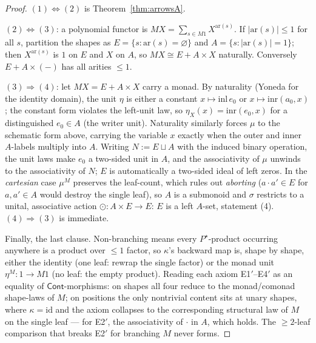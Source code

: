 \documentclass[11pt]{amsart}
\theoremstyle{plain}
\theoremstyle{definition}
\theoremstyle{remark}
\newcommand{\Cont}{\mathsf{Cont}}
\newcommand{\id}{\mathrm{id}}
\begin{document}
\begin{proof}
$(1)\Leftrightarrow(2)$ is Theorem~\ref{thm:arrowsA}.

$(2)\Leftrightarrow(3)$: a polynomial functor is $MX=\sum_{s\in M1}X^{\mathrm{ar}(s)}$. If
$|\mathrm{ar}(s)|\le1$ for all $s$, partition the shapes as $E=\{s:\mathrm{ar}(s)=
\varnothing\}$ and $A=\{s:|\mathrm{ar}(s)|=1\}$; then $X^{\mathrm{ar}(s)}$ is $1$ on $E$ and
$X$ on $A$, so $MX\cong E + A\times X$ naturally. Conversely $E+A\times(-)$ has all arities
$\le1$.

$(3)\Rightarrow(4)$: let $MX=E+A\times X$ carry a monad. By naturality (Yoneda for the
identity domain), the unit $\eta$ is either a constant $x\mapsto\mathrm{inl}\,e_0$ or
$x\mapsto\mathrm{inr}(a_0,x)$; the constant form violates the left-unit law, so
$\eta_X(x)=\mathrm{inr}(e_0,x)$ for a distinguished $e_0\in A$ (the writer unit). Naturality
similarly forces $\mu$ to the schematic form above, carrying the variable $x$ exactly when the
outer and inner $A$-labels multiply into $A$. Writing $N:=E\sqcup A$ with the induced binary
operation, the unit laws make $e_0$ a two-sided unit in $A$, and the associativity of $\mu$
unwinds to the associativity of $N$; $E$ is automatically a two-sided ideal of left zeros. In
the \emph{cartesian} case $\mu^M$ preserves the leaf-count, which rules out \emph{aborting}
($a\cdot a'\in E$ for $a,a'\in A$ would destroy the single leaf), so $A$ is a submonoid and
$\sigma$ restricts to a unital, associative action $\odot\colon A\times E\to E$: $E$ is a left
$A$-set, statement (4). $(4)\Rightarrow(3)$ is immediate.

Finally, the last clause. Non-branching means every $P^\star$-product occurring anywhere is a
product over $\le1$ factor, so $\kappa$'s backward map is, shape by shape, either the identity
(one leaf: rewrap the single factor) or the monad unit $\eta^M\colon1\to M1$ (no leaf: the
empty product). Reading each axiom E1$'$--E4$'$ as an equality of $\Cont$-morphisms: on shapes
all four reduce to the monad/comonad shape-laws of $M$; on positions the only nontrivial
content sits at unary shapes, where $\kappa=\id$ and the axiom collapses to the corresponding
structural law of $M$ on the single leaf --- for E2$'$, the associativity of $\cdot$ in $A$,
which holds. The $\ge2$-leaf comparison that breaks E2$'$ for branching $M$ never forms.
\end{proof}
\end{document}
